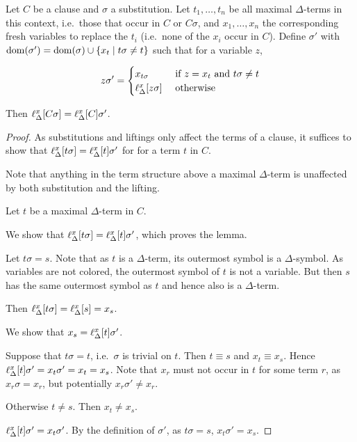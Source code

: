 \documentclass[,%
	paper=a4,%
	DIV14, 
	liststotoc,
	bibtotoc,
	draft=false,%
	numbers=noendperiod
]{scrartcl}
\newcommand{\lif}[1]{\lift{\Delta}{#1}{x}}
\begin{document}
\begin{lemma}
	\label{lemma:lif}

	Let $C$ be a clause and $\sigma$ a substitution.
	Let $t_1,\ldots,t_n$ be all maximal $\Delta$-terms in this context, i.e.\ those that occur in $C$ or $C\sigma$,  and 
	$x_1, \ldots, x_n$ the corresponding fresh variables to replace the $t_i$ (i.e.~none of the $x_i$ occur in $C$).
	Define $\sigma'$ with $\operatorname{dom}(\sigma') = \operatorname{dom}(\sigma) \cup \{ x_t \mid t\sigma \neq t \}$ such that for a variable $z$, 
	\begin{comment}
	\[ z \sigma' =
		\begin{cases} 
			x_l & \text{ if } z = x_k \text{ and } t_k\sigma = t_l \text{ for some $k$}  \\
			\lif{z\sigma} & \text{ otherwise}
		\end{cases} \]
	\end{comment}
	\[
		z \sigma' =
		\begin{cases} 
			x_{t\sigma} & \text{ if } z = x_t \text{ and } t\sigma \neq t \\
			\lif{z\sigma} & \text{ otherwise}
		\end{cases} 
	\]

	Then
	$\lif{C\sigma} =
	\lif{C}\sigma'$.
\end{lemma}
\begin{proof}
	As substitutions and liftings only affect the terms of a clause, it suffices to  show that 
	$\lif{t\sigma} = \lif{t}\sigma'$ for for a term $t$ in $C$.


	Note that anything in the term structure above a maximal $\Delta$-term is unaffected by both substitution and the lifting.

	Let $t$ be a maximal $\Delta$-term in $C$.

	We show that $ \lif{ t \sigma } = \lif{ t } \sigma'$, which proves the lemma.

	Let $t\sigma = s$.
	Note that as $t$ is a $\Delta$-term, its outermost symbol is a $\Delta$-symbol.
	As variables are not colored, the outermost symbol of $t$ is not a variable. 
	But then $s$ has the same outermost symbol as $t$ and hence also is a $\Delta$-term.
	
	Then $\lif{ t\sigma} = \lif{s} = x_s$.

	We show that $x_s = \lif{t}\sigma'$.

	Suppose that $t\sigma = t$, i.e.\ $\sigma$ is trivial on $t$.
	Then $t\equiv s$ and  $x_t \equiv x_s$.
	Hence $\lif{t}\sigma' = x_t \sigma' = x_t = x_s$.
	Note that $x_r$ must not occur in $t$ for some term $r$, as $x_r\sigma = x_r$, but potentially $x_r\sigma' \neq x_r$.

	Otherwise $t \neq s$. Then $x_t\neq x_s$.

	$\lif{t}\sigma' = x_t \sigma'$.
	By the definition of $\sigma'$, as $t\sigma = s$, $x_t\sigma' = x_s$.
\end{proof}
\end{document}

